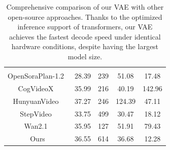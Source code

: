 \begin{table}[htb!]
\centering
\small
\begin{tabular}{c|c|c|c|c}
\toprule
{}     &  &  &   &  \\ & & & &
\\
\midrule
OpenSoraPlan-1.2~\citep{lin2024open} & 28.39         & 239       & 51.08           & 17.48                        \\ 
CogVideoX~\citep{cogvideox}        & 35.99         & 216        &  40.19        & 142.96                        \\ 
HunyuanVideo~\citep{kong2024hunyuanvideo}     & 37.27         & 246        &  124.39        & 47.11                        \\ 
StepVideo~\citep{ma2025step}        & 33.75         & 499          &  30.47      & 18.12                         \\ 
Wan2.1~\citep{wang2025wan}           & 35.95         & 127        &   51.91       & 79.43                        \\ 
Ours             & 36.55         & 614         &  36.68       & 12.28                        \\
\bottomrule
\end{tabular}
\vspace{0.5em}
\caption{Comprehensive comparison of our VAE with other open-source approaches. Thanks to the optimized inference support of transformers, our VAE achieves the fastest decode speed under identical hardware conditions, despite having the largest model size.}
\label{tab:vae_compare}
\end{table}
